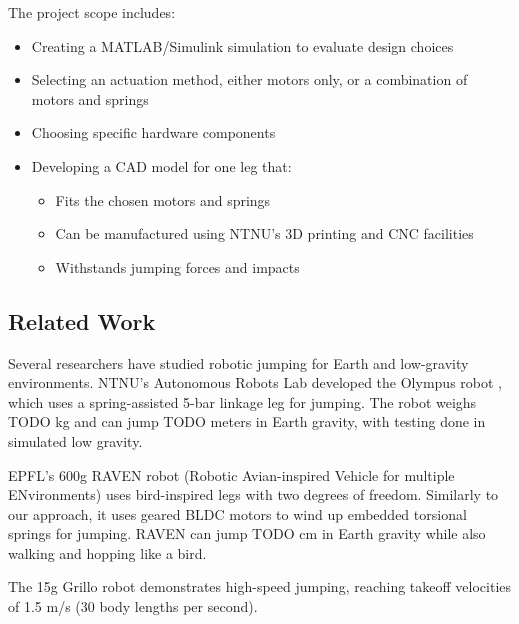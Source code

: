 The project scope includes:
\begin{itemize}
    \item Creating a MATLAB/Simulink simulation to evaluate design choices
    \item Selecting an actuation method, either motors only, or a combination of motors and springs
    \item Choosing specific hardware components
    \item Developing a CAD model for one leg that:
    \begin{itemize}
        \item Fits the chosen motors and springs
        \item Can be manufactured using NTNU's 3D printing and CNC facilities
        \item Withstands jumping forces and impacts
    \end{itemize}
\end{itemize}

\subsection{Related Work}
\label{sec:related_work}

Several researchers have studied robotic jumping for Earth and low-gravity environments. NTNU's Autonomous Robots Lab developed the Olympus robot \cite{OLYMPUS1} \cite{OLYMPUS2}, which uses a spring-assisted 5-bar linkage leg for jumping. The robot weighs TODO kg and can jump TODO meters in Earth gravity, with testing done in simulated low gravity.

EPFL's 600g RAVEN robot (Robotic Avian-inspired Vehicle for multiple ENvironments) \cite{RAVEN} uses bird-inspired legs with two degrees of freedom. Similarly to our approach, it uses geared BLDC motors to wind up embedded torsional springs for jumping. RAVEN can jump TODO cm in Earth gravity while also walking and hopping like a bird.

The 15g Grillo robot \cite{GRILLO} demonstrates high-speed jumping, reaching takeoff velocities of 1.5 m/s (30 body lengths per second).

